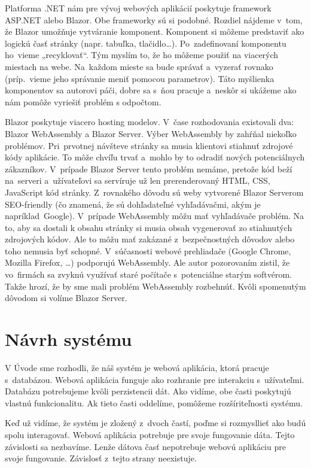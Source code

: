 Platforma .NET nám pre vývoj webových aplikácií poskytuje framework\\ASP.NET alebo Blazor. Obe frameworky sú si podobné. Rozdiel náj\-de\-me v~tom, že Blazor umožňuje vytváranie komponent. Komponent si môžeme predstaviť ako logickú časť stránky (napr. tabuľka, tlačidlo\dots). Po~zadefinovaní komponentu ho~vieme „recyklovať“. Tým myslím to, že ho môžeme použiť na viacerých miestach na webe. Na~každom mieste sa bude správať a~vyzerať rovnako (príp.~vie\-me  jeho správanie meniť pomocou parametrov). Táto myšlienka komponentov sa autorovi páči, dobre sa s~ňou pracuje a~neskôr si ukážeme ako nám pomôže vyriešiť problém s odpočtom.

Blazor poskytuje viacero hosting modelov. V~čase rozhodovania existovali dva: Blazor WebAssembly a Blazor Server. Výber WebAssembly by zahŕňal niekoľko problémov. Pri~prvotnej návšteve stránky sa musia klientovi stiahnuť zdrojové kódy aplikácie. To môže chvíľu trvať a~mohlo by to odradiť nových potenciálnych zákazníkov. V~prípade Blazor Server tento problém nemáme, pretože kód beží na~serveri a~užívateľovi sa servíruje už len prerenderovaný HTML, CSS, JavaScript kód stránky. Z~rovnakého dôvodu sú weby vytvorené Blazor Ser\-ve\-rom SEO-friendly (čo znamená, že sú dohľadateľné vyhľadávačmi, akým je napríklad~Google). V~prípade WebAssembly môžu mať vyhľadávače problém. Na to, aby sa dostali k obsahu stránky si musia obsah vygenerovať zo stiahnutých zdrojových kódov. Ale  to môžu mať zakázané z~bezpečnostných dôvodov alebo toho nemusia byť schopné. V~súčasnosti webové prehliadače (Google Chrome, Mozilla Firefox, \dots) podporujú WebAssembly. Ale autor pozorovaním zistil, že vo~firmách sa zvyknú využívať staré počítače s~potenciálne starým softvérom. Takže hrozí, že by sme mali problém WebAssembly rozbehnúť. Kvôli spomenutým dôvodom si volíme Blazor Server.

\section{Návrh systému}

V Úvode sme rozhodli, že náš systém je webová aplikácia, ktorá pracuje s~databázou. Webová aplikácia funguje ako rozhranie pre interakciu s~užívateľmi. Databázu potrebujeme kvôli perzistencii dát. Ako vidíme, obe časti poskytujú vlastnú funkcionalitu. Ak tieto časti oddelíme, pomôžeme rozšíriteľnosti systému.

Keď už vidíme, že systém je zložený z~dvoch častí, poďme si rozmysllieť ako budú spolu interagovať. Webová aplikácia potrebuje pre svoje fungovanie dáta. Tejto závislosti sa nezbavíme. Lenže dátova časť nepotrebuje webovú aplikáciu pre svoje fungovanie. Závislosť z~tejto strany neexistuje.

